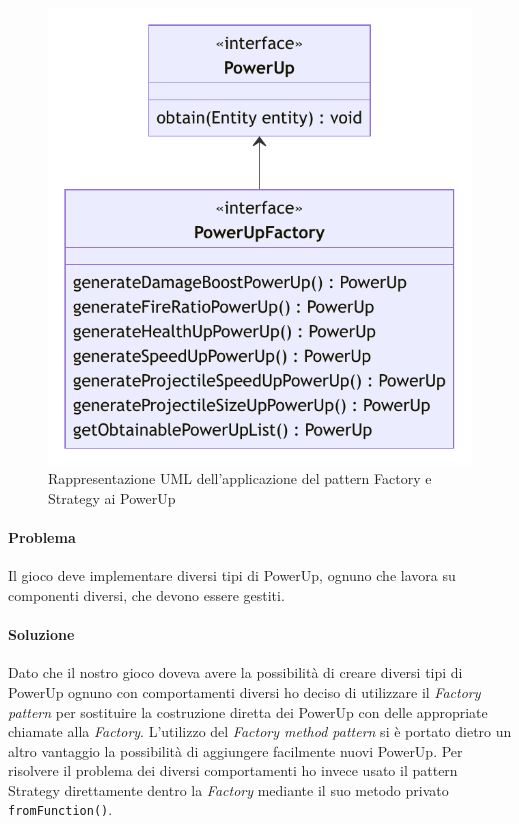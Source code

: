 \documentclass[a4paper,12pt]{report}
\begin{document}
\begin{figure}[H]
\centering{}
\includegraphics[width=\textwidth]{img/PowerUpUML}
\caption{Rappresentazione UML dell'applicazione del pattern Factory e Strategy ai PowerUp}
\label{img:observer}
\end{figure}

\paragraph{Problema} Il gioco deve implementare diversi tipi di PowerUp, ognuno che lavora su componenti diversi, che devono essere gestiti.

\paragraph{Soluzione} Dato che il nostro gioco doveva avere la possibilità di creare diversi tipi di PowerUp ognuno con comportamenti diversi ho deciso di utilizzare il \textit{Factory pattern} per sostituire la costruzione diretta dei PowerUp con delle appropriate chiamate alla \textit{Factory}. L'utilizzo del \textit{Factory method pattern} si è portato dietro un altro vantaggio la possibilità di aggiungere facilmente nuovi PowerUp.
Per risolvere il problema dei diversi comportamenti ho invece usato il pattern Strategy direttamente dentro la \textit{Factory} mediante il suo metodo privato \texttt{fromFunction()}.
\end{document}
